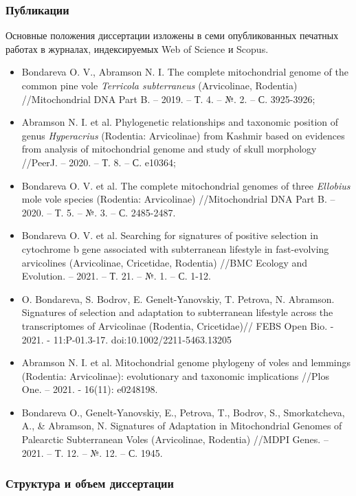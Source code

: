 \subsubsection*{Публикации}
Основные положения диссертации изложены в семи опубликованных печатных работах в журналах, индексируемых Web of Science и Scopus.
\begin{itemize} 
	\item[\textbullet] Bondareva O. V., Abramson N. I. The complete mitochondrial genome of the common pine vole \textit{Terricola subterraneus} (Arvicolinae, Rodentia) //Mitochondrial DNA Part B. – 2019. – Т. 4. – №. 2. – С. 3925-3926;
	\item[\textbullet] Abramson N. I. et al. Phylogenetic relationships and taxonomic position of genus \textit{Hyperacrius} (Rodentia: Arvicolinae) from Kashmir based on evidences from analysis of mitochondrial genome and study of skull morphology //PeerJ. – 2020. – Т. 8. – С. e10364;
	\item[\textbullet] Bondareva O. V. et al. The complete mitochondrial genomes of three \textit{Ellobius} mole vole species (Rodentia: Arvicolinae) //Mitochondrial DNA Part B. – 2020. – Т. 5. – №. 3. – С. 2485-2487. 
	\item[\textbullet] Bondareva O. V. et al. Searching for signatures of positive selection in cytochrome b gene associated with subterranean lifestyle in fast-evolving arvicolines (Arvicolinae, Cricetidae, Rodentia) //BMC Ecology and Evolution. – 2021. – Т. 21. – №. 1. – С. 1-12.
	\item[\textbullet] O. Bondareva, S. Bodrov, E. Genelt-Yanovskiy, T. Petrova, N. Abramson. Signatures of selection and adaptation to subterranean lifestyle across the transcriptomes of Arvicolinae (Rodentia, Cricetidae)// FEBS Open Bio. - 2021. - 11:P-01.3-17. doi:10.1002/2211-5463.13205
	\item[\textbullet] Abramson N. I. et al. Mitochondrial genome phylogeny of voles and lemmings (Rodentia: Arvicolinae): evolutionary and taxonomic implications //Plos One. – 2021. - 16(11): e0248198.
	\item[\textbullet]  Bondareva O., Genelt-Yanovskiy, E., Petrova, T., Bodrov, S., Smorkatcheva, A., \& Abramson, N.  Signatures of Adaptation in Mitochondrial Genomes of Palearctic Subterranean Voles (Arvicolinae, Rodentia) //MDPI Genes. – 2021. – Т. 12. – №. 12. – С. 1945.
\end{itemize}


\subsubsection*{Структура и объем диссертации}

